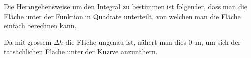 \documentclass[a4paper,11pt]{report}
\begin{document}
\begin{minipage}{.5\textwidth}
    Die Herangehensweise um den Integral zu bestimmen ist folgender, dass man die Fläche unter der Funktion in Quadrate unterteilt, von welchen man die Fläche einfach berechnen kann.

    Da mit grossem $\Delta h$ die Fläche ungenau ist, nähert man dies 0 an, um sich der tatsächlichen Fläche unter der Kuzrve anzunähern.
\end{minipage}
\begin{minipage}{.5\textwidth}
    \begin{center}
    \end{center}
\end{minipage}

\vspace{.5cm}
\end{document}
